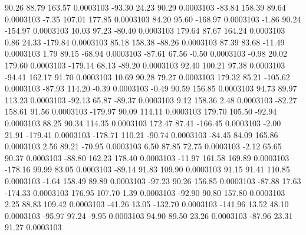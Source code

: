        90.26       88.79      163.57     0.0003103
      -93.30       24.23       90.29     0.0003103
      -83.84      158.39       89.64     0.0003103
       -7.35      107.01      177.85     0.0003103
       84.20       95.60     -168.97     0.0003103
       -1.86       90.24     -154.97     0.0003103
       10.03       97.23      -80.40     0.0003103
      179.64       87.67      164.24     0.0003103
        0.86       24.33     -179.84     0.0003103
       85.18      158.38      -88.26     0.0003103
       87.39       83.68      -11.49     0.0003103
        1.79       89.15      -68.94     0.0003103
      -87.61       67.56       -0.50     0.0003103
       -0.98       20.02      179.60     0.0003103
     -179.14       68.13      -89.20     0.0003103
       92.40      100.21       97.38     0.0003103
      -94.41      162.17       91.70     0.0003103
       10.69       90.28       79.27     0.0003103
      179.32       85.21     -105.62     0.0003103
      -87.93      114.20       -0.39     0.0003103
       -0.49       90.59      156.85     0.0003103
       94.73       89.97      113.23     0.0003103
      -92.13       65.87      -89.37     0.0003103
        9.12      158.36        2.48     0.0003103
      -82.27      158.61       91.56     0.0003103
     -179.97       90.09      114.11     0.0003103
      179.70      105.50      -92.94     0.0003103
       88.25       90.34      114.35     0.0003103
      172.47       87.41     -166.45     0.0003103
       -2.00       21.91     -179.41     0.0003103
     -178.71      110.21      -90.74     0.0003103
      -84.45       84.09      165.86     0.0003103
        2.56       89.21      -70.95     0.0003103
        6.50       87.85       72.75     0.0003103
       -2.12       65.65       90.37     0.0003103
      -88.80      162.23      178.40     0.0003103
      -11.97      161.58      169.89     0.0003103
     -178.16       99.99       83.05     0.0003103
      -89.14       91.83      109.90     0.0003103
       91.15       91.41      110.85     0.0003103
       -1.64      158.49       89.89     0.0003103
      -97.23       90.26      156.85     0.0003103
      -87.88       17.63     -174.33     0.0003103
      176.95      107.70        1.39     0.0003103
      -92.90       90.80      157.80     0.0003103
        2.25       88.83      109.42     0.0003103
      -41.26       13.05     -132.70     0.0003103
     -141.96       13.52       48.10     0.0003103
      -95.97       97.24       -9.95     0.0003103
       94.90       89.50       23.26     0.0003103
      -87.96       23.31       91.27     0.0003103
